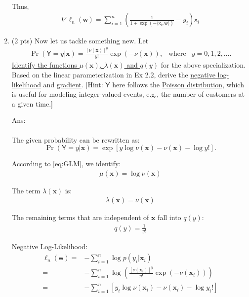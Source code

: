 \documentclass[10pt]{article}
\newcommand{\xv}{\mathbf{x}}
\newcommand{\inner}[2]{\langle #1, #2 \rangle}
\newcommand{\xbs}{\bm{\mathsf{x}}}
\newcommand{\wbs}{\bm{\mathsf{w}}}
\newcommand{\Ysf}{\mathsf{Y}}
\newcommand{\eg}{{e.g.}\xspace}
\newcommand{\ans}[1]{{\color{orange}\textsf{Ans}: #1}}
\begin{document}
\begin{exercise}
\begin{enumerate}
\begin{equation*}
\begin{aligned}
            \end{aligned}
          \end{equation*}
          Thus,
          \begin{align}
            \boxed{\nabla \ell_n(\wbs) = \sum_{i=1}^n \left(\frac{1}{1+\exp(-\inner{\xbs_i}{\wbs})}-y_i\right)\xbs_i}
          \end{align}
          {\vskip0.5cm}
    \item (2 pts) Now let us tackle something new. Let
          \begin{align}
            \Pr(\Ysf = y | \xv) = \frac{[\nu(\xv)]^y}{y!} \exp(-\nu(\xv)), ~~ \mbox{ where } ~~ y = 0, 1, 2, \ldots.
          \end{align}
          \uline{Identify the functions $\mu(\xv)$, $\lambda(\xv)$ and $q(y)$} for the above specialization. Based on the linear parameterization in Ex 2.2, derive the \uline{negative log-likelihood} and \uline{gradient}. [Hint: $\Ysf$ here follows the \href{https://en.wikipedia.org/wiki/Poisson_distribution}{Poisson distribution}, which is useful for modeling integer-valued events, \eg, the number of customers at a given time.]

          \ans\\
          \leavevmode\\
          The given probability can be rewritten as:
          $$
            \Pr(\Ysf = y | \xv) = \exp\left[ y \log \nu(\xv) - \nu(\xv) - \log y! \right].
          $$

          According to \eqref{eq:GLM}, we identify:
          \begin{align}
            \boxed{\mu(\xv) = \log \nu(\xv)}
          \end{align}

          The term $\lambda(\xv)$ is:
          \begin{align}
            \boxed{\lambda(\xv) = \nu(\xv)}
          \end{align}

          The remaining terms that are independent of $\xv$ fall into $q(y)$:
          \begin{align}
            \boxed{q(y) = \frac{1}{y!}}
          \end{align}

          Negative Log-Likelihood:
          \begin{equation*}
            \begin{aligned}
              \ell_n(\wbs) = & -\sum_{i=1}^n \log p(y_i | \xv_i)                                           \\
              =              & -\sum_{i=1}^n \log \left(\frac{[\nu(\xv_i)]^y}{y!} \exp(-\nu(\xv_i))\right) \\
              =              & -\sum_{i=1}^n \left[ y_i \log \nu(\xv_i) - \nu(\xv_i) - \log y_i! \right]
            \end{aligned}
          \end{equation*}


\end{enumerate}
\end{exercise}
\end{document}
